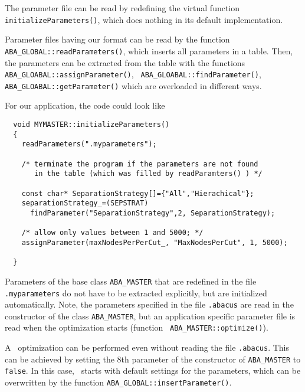 \noindent
The parameter file can be read by redefining the virtual function
{\tt initializeParameters()}, which does nothing in its default 
implementation.

Parameter files having our format can be read by the 
function {\tt ABA\_GLOBAL::readParameters()}, which inserts all parameters in a table.
Then, the parameters can be extracted from the table with the
functions {\tt ABA\_GLOABAL::assignParameter()}, {\tt
ABA\_GLOABAL::findParameter()}, {\tt ABA\_GLOABAL::getParameter()}
which are overloaded in different ways.

For our application, the code could look like
\begin{verbatim}
  void MYMASTER::initializeParameters()
  {
    readParameters(".myparameters");

    /* terminate the program if the parameters are not found
       in the table (which was filled by readParamters() ) */

    const char* SeparationStrategy[]={"All","Hierachical"};
    separationStrategy_=(SEPSTRAT)
      findParameter("SeparationStrategy",2, SeparationStrategy);

    /* allow only values between 1 and 5000; */
    assignParameter(maxNodesPerPerCut_, "MaxNodesPerCut", 1, 5000);

  }
\end{verbatim}


Parameters of the base class {\tt ABA\_MASTER} that are redefined in the file
{\tt .myparameters} do not have to be extracted explicitly, but are
initialized automatically.
Note, the parameters specified in the file {\tt .abacus} are read
in the constructor of the class {\tt ABA\_MASTER}, but an application specific
parameter file is read when the optimization starts (function {\tt
  ABA\_MASTER::optimize()}).


A \bac\ optimization can be performed even without reading
the file {\tt .abacus}. This can be achieved by setting the 8th
parameter of the constructor of {\tt ABA\_MASTER} to {\tt false}. 
In this case, \ABACUS\ starts with default settings for the
parameters, which can be overwritten by the function 
{\tt ABA\_GLOBAL::insertParameter()}.

